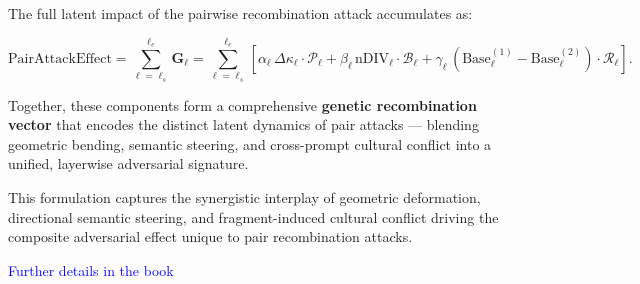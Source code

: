 The full latent impact of the pairwise recombination attack accumulates as:

\[
\boxed{
\text{PairAttackEffect} = \sum_{\ell=\ell_s}^{\ell_e} \mathbf{G}_\ell = \sum_{\ell=\ell_s}^{\ell_e} \left[
\alpha_\ell \, \Delta \kappa_\ell \cdot \mathcal{P}_\ell + \beta_\ell \, \text{nDIV}_\ell \cdot \mathcal{B}_\ell + \gamma_\ell \, (\text{Base}_\ell^{(1)} - \text{Base}_\ell^{(2)}) \cdot \mathcal{R}_\ell
\right].
}
\]


Together, these components form a comprehensive \textbf{genetic recombination vector} that encodes the distinct latent dynamics of pair attacks — blending geometric bending, semantic steering, and cross-prompt cultural conflict into a unified, layerwise adversarial signature.


This formulation captures the synergistic interplay of geometric deformation, directional semantic steering, and fragment-induced cultural conflict driving the composite adversarial effect unique to pair recombination attacks.






\clearpage
\newpage

\vspace*{\fill}
\begin{center}
\textcolor{blue}{Further details in the book}
\end{center}
\vspace*{\fill}

\clearpage
\newpage







































